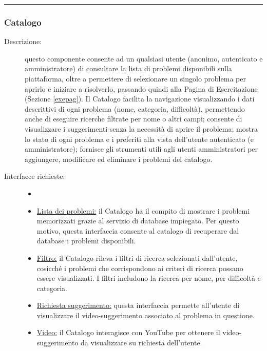 \documentclass[11pt, a4paper]{article}
\theoremstyle{definition} %
\begin{document}
\begin{center}
    \rule{5cm}{1pt}
\end{center}

\subsubsection{Catalogo}
\begin{description}
    \item[Descrizione:] questo componente consente ad un qualsiasi utente
    (anonimo, autenticato e amministratore) di consultare la lista di problemi
    disponibili sulla piattaforma, oltre a permettere di selezionare un singolo
    problema per aprirlo e iniziare a risolverlo, passando quindi alla Pagina di
    Esercitazione (Sezione \ref{exepag}).
    Il Catalogo facilita la navigazione visualizzando i dati descrittivi di ogni
    problema (nome, categoria, difficoltà), permettendo anche di eseguire ricerche
    filtrate per nome o altri campi; consente di visualizzare i suggerimenti senza
    la necessità di aprire il problema; mostra lo stato di ogni problema e i
    preferiti alla vista dell'utente autenticato (e amministratore); fornisce gli
    strumenti utili agli utenti amministratori per aggiungere, modificare ed
    eliminare i problemi del catalogo.

    \item[Interfacce richieste:]
    \begin{itemize}
        \item[]

        \item \underline{Lista dei problemi:} il Catalogo ha il compito di
        mostrare i problemi memorizzati grazie al servizio di database impiegato.
        Per questo motivo, questa interfaccia consente al catalogo di recuperare
        dal database i problemi disponibili.

        \item \underline{Filtro:} il Catalogo rileva i filtri di ricerca selezionati
        dall'utente, cosicché i problemi che corrispondono ai criteri di ricerca possano
        essere visualizzati. I filtri includono la ricerca per nome, per difficoltà e categoria.

        \item \underline{Richiesta suggerimento:} questa interfaccia permette all'utente
        di visualizzare il video-suggerimento associato al problema in questione.

        \item \underline{Video:} il Catalogo interagisce con YouTube per ottenere il
        video-suggerimento da visualizzare su richiesta dell'utente.


\end{itemize}
\end{description}
\end{document}

